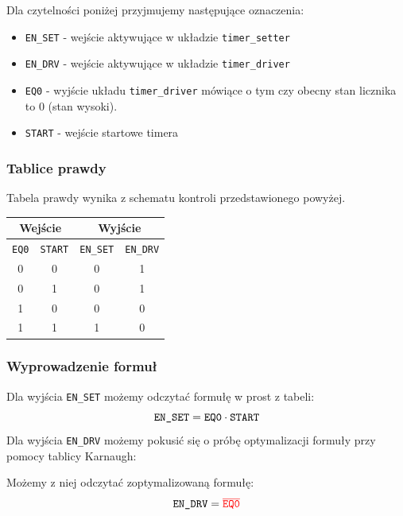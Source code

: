 \documentclass[a4paper]{article}
\begin{document}
Dla czytelności poniżej przyjmujemy następujące oznaczenia:
\begin{itemize}
    \item \verb|EN_SET| - wejście aktywujące w układzie \verb|timer_setter|
    \item \verb|EN_DRV| - wejście aktywujące w układzie \verb|timer_driver|
    \item \verb|EQ0| - wyjście układu \verb|timer_driver| mówiące o tym czy obecny stan licznika to 0 (stan wysoki).
    \item \verb|START| - wejście startowe timera
\end{itemize}

\subsubsection{Tablice prawdy}

Tabela prawdy wynika z schematu kontroli przedstawionego powyżej.
\begin{center}
    \begin{tabular}{|c|c||c|c|}
    \hline \multicolumn{2}{|c||}{Wejście} & \multicolumn{2}{|c|}{Wyjście} \\
    \hline \verb|EQ0| & \verb|START| & \verb|EN_SET| & \verb|EN_DRV| \\
    \hline 0 & 0 & 0 & 1 \\
    \hline 0 & 1 & 0 & 1 \\
    \hline 1 & 0 & 0 & 0 \\
    \hline 1 & 1 & 1 & 0 \\
    \hline 
    \end{tabular}
\end{center}

\subsubsection{Wyprowadzenie formuł}
Dla wyjścia \verb|EN_SET| możemy odczytać formułę w prost z tabeli:
\[ \verb|EN_SET| = \verb|EQ0| \cdot \verb|START|  \] 
Dla wyjścia \verb|EN_DRV| możemy pokusić się o próbę optymalizacji formuły
przy pomocy tablicy Karnaugh:
\begin{center}
    \begin{karnaugh-map}
    \end{karnaugh-map}
\end{center}
Możemy z niej odczytać zoptymalizowaną formułę:
\[ \verb|EN_DRV| = \textcolor{red}{\overline{\texttt{EQ0}}} \]
\end{document}
